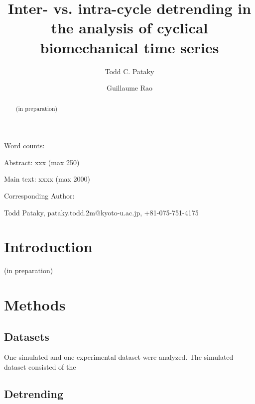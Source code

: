 \documentclass[preprint,11pt]{elsarticle}
\title{Inter- vs. intra-cycle detrending in the analysis of cyclical biomechanical time series}
\author[1]{Todd C. Pataky}
\author[2]{Guillaume Rao}
\begin{document}
\begin{abstract}
(in preparation) 





\end{abstract}
\maketitle

\vspace{10mm}

Word counts:

Abstract:   xxx  (max 250)

Main text:   xxxx  (max 2000)

\vspace{10mm}



\vspace{10mm}
Corresponding Author:

Todd Pataky, pataky.todd.2m@kyoto-u.ac.jp, +81-075-751-4175






\clearpage
\section{Introduction}
\label{sec:introduction}
\doublespacing

(in preparation)




\section{Methods}
\label{sec:methods}

\subsection{Datasets}

One simulated and one experimental dataset were analyzed. The simulated dataset consisted of the \citep{Schwartz2008}

\subsection{Detrending}
\end{document}
